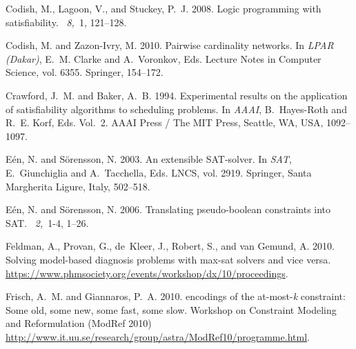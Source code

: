 \documentclass{tlp}
\begin{document}
\begin{thebibliography}{}
{\sc Codish, M.}, {\sc Lagoon, V.}, {\sc and} {\sc Stuckey, P.~J.} 2008.
\newblock Logic programming with satisfiability.
~{\em 8,\/}~1, 121--128.

{\sc Codish, M.} {\sc and} {\sc Zazon-Ivry, M.} 2010.
\newblock Pairwise cardinality networks.
\newblock In {\em LPAR (Dakar)}, {E.~M. Clarke} {and} {A.~Voronkov}, Eds.
  Lecture Notes in Computer Science, vol. 6355. Springer, 154--172.

{\sc Crawford, J.~M.} {\sc and} {\sc Baker, A.~B.} 1994.
\newblock Experimental results on the application of satisfiability algorithms
  to scheduling problems.
\newblock In {\em AAAI}, {B.~Hayes-Roth} {and} {R.~E. Korf}, Eds. Vol.~2. AAAI
  Press / The MIT Press, Seattle, WA, USA, 1092--1097.

{\sc E{\'e}n, N.} {\sc and} {\sc S{\"o}rensson, N.} 2003.
\newblock An extensible {SAT}-solver.
\newblock In {\em SAT}, {E.~Giunchiglia} {and} {A.~Tacchella}, Eds. LNCS, vol.
  2919. Springer, Santa Margherita Ligure, Italy, 502--518.

{\sc E\'en, N.} {\sc and} {\sc S\"orensson, N.} 2006.
\newblock Translating pseudo-boolean constraints into {SAT}.
~{\em 2,\/}~1-4, 1--26.

{\sc Feldman, A.}, {\sc Provan, G.}, {\sc de~Kleer, J.}, {\sc Robert, S.}, {\sc
  and} {\sc van Gemund, A.} 2010.
\newblock Solving model-based diagnosis problems with max-sat solvers and vice
  versa.
\newblock \url{https://www.phmsociety.org/events/workshop/dx/10/proceedings}.

{\sc Frisch, A.~M.} {\sc and} {\sc Giannaros, P.~A.} 2010.
 encodings of the at-most-\textit{k} constraint: Some old, some
  new, some fast, some slow.
\newblock Workshop on Constraint Modeling and Reformulation (ModRef 2010)
  \url{http://www.it.uu.se/research/group/astra/ModRef10/programme.html}.


\end{thebibliography}
\end{document}
